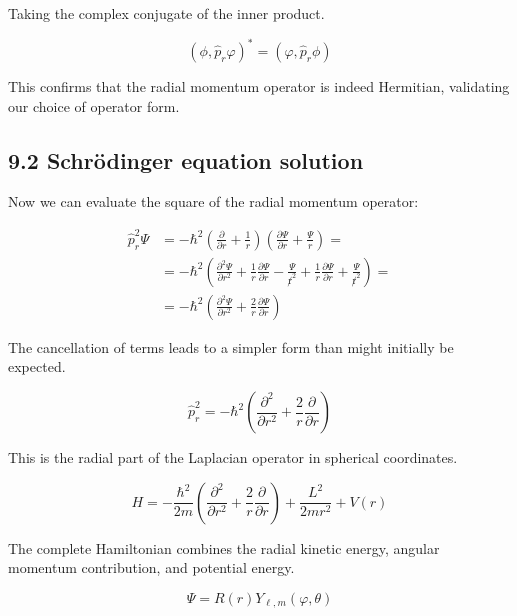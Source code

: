 \documentclass[10pt]{article}
\begin{document}
Taking the complex conjugate of the inner product.

\begin{equation*}
\left(\phi, \hat{p}_{r} \varphi\right)^{*}=\left(\varphi, \hat{p}_{r} \phi\right) \tag{9.26}
\end{equation*}

This confirms that the radial momentum operator is indeed Hermitian, validating our choice of operator form.

\subsection*{9.2 Schrödinger equation solution}
Now we can evaluate the square of the radial momentum operator:

\begin{align*}
\hat{p}_{r}^{2} \Psi & =-\hbar^{2}\left(\frac{\partial}{\partial r}+\frac{1}{r}\right)\left(\frac{\partial \Psi}{\partial r}+\frac{\Psi}{r}\right)= \\
& =-\hbar^{2}\left(\frac{\partial^{2} \Psi}{\partial r^{2}}+\frac{1}{r} \frac{\partial \Psi}{\partial r}-\frac{\Psi}{\not r^{2}}+\frac{1}{r} \frac{\partial \Psi}{\partial r}+\frac{\Psi}{\not r^{2}}\right)=  \tag{9.27}\\
& =-\hbar^{2}\left(\frac{\partial^{2} \Psi}{\partial r^{2}}+\frac{2}{r} \frac{\partial \Psi}{\partial r}\right)
\end{align*}

The cancellation of terms leads to a simpler form than might initially be expected.

\begin{equation*}
\hat{p}_{r}^{2}=-\hbar^{2}\left(\frac{\partial^{2}}{\partial r^{2}}+\frac{2}{r} \frac{\partial}{\partial r}\right) \tag{9.28}
\end{equation*}

This is the radial part of the Laplacian operator in spherical coordinates.

\begin{equation*}
H=-\frac{\hbar^{2}}{2 m}\left(\frac{\partial^{2}}{\partial r^{2}}+\frac{2}{r} \frac{\partial}{\partial r}\right)+\frac{L^{2}}{2 m r^{2}}+V(r) \tag{9.29}
\end{equation*}

The complete Hamiltonian combines the radial kinetic energy, angular momentum contribution, and potential energy.

\begin{equation*}
\Psi=R(r) Y_{\ell, m}(\varphi, \theta) \tag{9.30}
\end{equation*}
\end{document}
